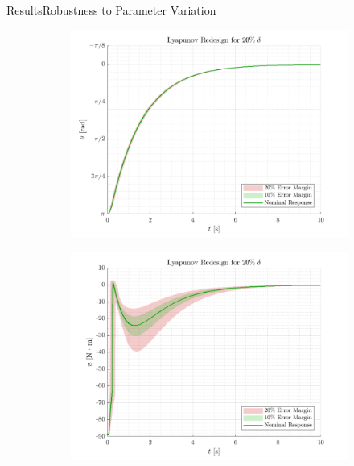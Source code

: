 \begin{frame}{Results}{Robustness to Parameter Variation}
\begin{figure}[H]
  \begin{minipage}{0.45\linewidth}
    \begin{figure}[H]
      \centering
      \includegraphics[width=\linewidth]{figures/lyapunovRedesign}
    \end{figure}        
  \end{minipage}\hfill      
  \begin{minipage}{0.45\linewidth}
    \begin{figure}[H]
      \centering
      \includegraphics[width=1\linewidth]{figures/lyapunovRedesign_u}
    \end{figure}                
  \end{minipage}\hfill \\
\end{figure}
\end{frame}

